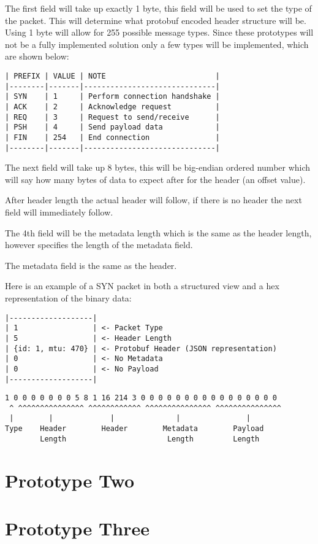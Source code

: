 The first field will take up exactly 1 byte, this field will be used to set the type of the packet. This will determine what protobuf encoded header structure will be. Using 1 byte will allow for 255 possible message types. Since these prototypes will not be a fully implemented solution only a few types will be implemented, which are shown below:

\begin{lstlisting}[float,caption=Prototype One Packet Types]
| PREFIX | VALUE | NOTE                         |
|--------|-------|------------------------------|
| SYN    | 1     | Perform connection handshake |
| ACK    | 2     | Acknowledge request          |
| REQ    | 3     | Request to send/receive      |
| PSH    | 4     | Send payload data            |
| FIN    | 254   | End connection               |
|--------|-------|------------------------------|
\end{lstlisting}

The next field will take up 8 bytes, this will be big-endian ordered number which will say how many bytes of data to expect after for the header (an offset value).

After header length the actual header will follow, if there is no header the next field will immediately follow.

The 4th field will be the metadata length which is the same as the header length, however specifies the length of the metadata field.

The metadata field is the same as the header.

Here is an example of a SYN packet in both a structured view and a hex representation of the binary data:

\begin{lstlisting}[float,caption=Prototype One Example Packet Structure]
|-------------------|
| 1                 | <- Packet Type
| 5                 | <- Header Length
| {id: 1, mtu: 470} | <- Protobuf Header (JSON representation)
| 0                 | <- No Metadata
| 0                 | <- No Payload
|-------------------|
\end{lstlisting}

\begin{lstlisting}[float,caption=Prototype One Example Packet Binary]
 1 0 0 0 0 0 0 0 5 8 1 16 214 3 0 0 0 0 0 0 0 0 0 0 0 0 0 0 0 0
 ^ ^^^^^^^^^^^^^^^ ^^^^^^^^^^^^ ^^^^^^^^^^^^^^^ ^^^^^^^^^^^^^^^
 |        |             |              |               |
Type    Header        Header        Metadata        Payload
        Length                       Length         Length
\end{lstlisting}


\section{Prototype Two}

\section{Prototype Three}
